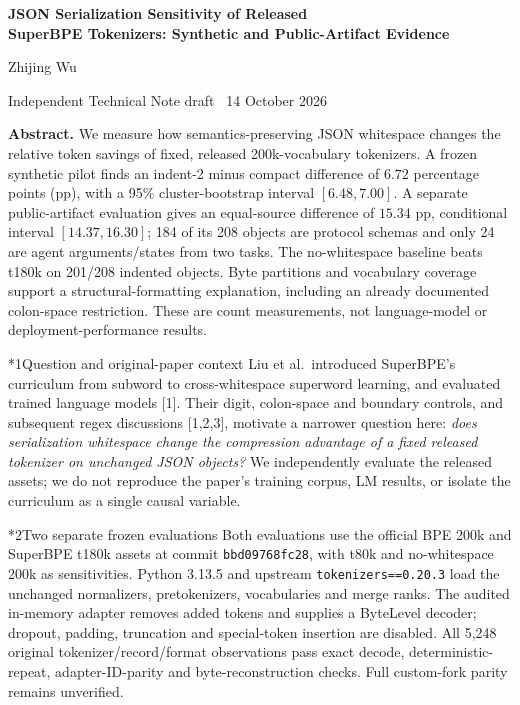\documentclass[10pt,a4paper]{article}
\makeatletter
\renewcommand\section{\@startsection{section}{1}{0pt}{1.5ex plus .3ex minus .1ex}{.6ex plus .1ex}{\normalfont\normalsize\bfseries}}
\makeatother
\begin{document}
\color{ink}
\begin{center}
{\fontsize{16}{19}\selectfont\bfseries JSON Serialization Sensitivity of Released\\
SuperBPE Tokenizers: Synthetic and Public-Artifact Evidence\par}
\vspace{4pt}
{\normalsize Zhijing Wu\par}
{\small Independent Technical Note draft \textbullet\ 14 October 2026\par}
\end{center}
\vspace{-5pt}

\textbf{Abstract.}
We measure how semantics-preserving JSON whitespace changes the relative token
savings of fixed, released 200k-vocabulary tokenizers. A frozen synthetic pilot
finds an indent-2 minus compact difference of \(6.72\) percentage points (pp),
with a 95\% cluster-bootstrap interval \([6.48,7.00]\).
A separate public-artifact evaluation gives an equal-source difference of
\(15.34\) pp, conditional interval \([14.37,16.30]\); 184 of its 208 objects
are protocol schemas and only 24 are agent arguments/states from two tasks.
The no-whitespace baseline beats t180k on 201/208 indented objects.
Byte partitions and vocabulary coverage support a structural-formatting
explanation, including an already documented colon-space restriction.
These are count measurements, not language-model or deployment-performance results.

\section*{\normalsize 1\quad Question and original-paper context}
Liu et al.\ introduced SuperBPE's curriculum from subword to
cross-whitespace superword learning, and evaluated trained language models [1].
Their digit, colon-space and boundary controls, and subsequent regex discussions
[1,2,3], motivate a narrower question here:
\emph{does serialization whitespace change the compression advantage of a
fixed released tokenizer on unchanged JSON objects?}
We independently evaluate the released assets; we do not reproduce the paper's
training corpus, LM results, or isolate the curriculum as a single causal variable.

\section*{\normalsize 2\quad Two separate frozen evaluations}
Both evaluations use the official BPE 200k and SuperBPE t180k assets at commit
\texttt{bbd09768fc28}, with t80k and no-whitespace 200k as sensitivities.
Python 3.13.5 and upstream \texttt{tokenizers==0.20.3} load the unchanged
normalizers, pretokenizers, vocabularies and merge ranks. The audited in-memory
adapter removes added tokens and supplies a ByteLevel decoder; dropout,
padding, truncation and special-token insertion are disabled.
All 5,248 original tokenizer/record/format observations pass exact decode,
deterministic-repeat, adapter-ID-parity and byte-reconstruction checks.
Full custom-fork parity remains unverified.
\end{document}
